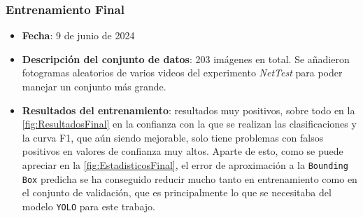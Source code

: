 \clearpage

\subsubsection*{Entrenamiento Final}
\label{train:final}
\begin{itemize}
    \item \textbf{Fecha}: 9 de junio de 2024
    \item \textbf{Descripción del conjunto de datos}: 203 imágenes en total. Se añadieron fotogramas aleatorios de varios videos del experimento \textit{NetTest} para poder manejar un conjunto más grande.
    \item \textbf{Resultados del entrenamiento}: resultados muy positivos, sobre todo en la \autoref{fig:ResultadosFinal} en la confianza con la que se realizan las clasificaciones y la curva F1, que aún siendo mejorable, solo tiene problemas 
    con falsos positivos en valores de confianza muy altos. Aparte de esto, como se puede apreciar en la \autoref{fig:EstadisticosFinal}, el error de aproximación a la \texttt{Bounding Box} predicha se ha 
    conseguido reducir mucho tanto en entrenamiento como en el conjunto de validación, que es principalmente lo que se necesitaba del modelo \texttt{YOLO} para este trabajo.
    

\end{itemize}
